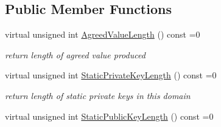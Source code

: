 \subsection*{Public Member Functions}
\begin{DoxyCompactItemize}
\item 
\hypertarget{class_authenticated_key_agreement_domain_a98ff4ab957b445060f06c95636a098ea}{
virtual unsigned int \hyperlink{class_authenticated_key_agreement_domain_a98ff4ab957b445060f06c95636a098ea}{AgreedValueLength} () const =0}
\label{class_authenticated_key_agreement_domain_a98ff4ab957b445060f06c95636a098ea}

\begin{DoxyCompactList}\small\item\em return length of agreed value produced \item\end{DoxyCompactList}\item 
\hypertarget{class_authenticated_key_agreement_domain_a1ede4e454e74031ec0f0786dc2a14ddf}{
virtual unsigned int \hyperlink{class_authenticated_key_agreement_domain_a1ede4e454e74031ec0f0786dc2a14ddf}{StaticPrivateKeyLength} () const =0}
\label{class_authenticated_key_agreement_domain_a1ede4e454e74031ec0f0786dc2a14ddf}

\begin{DoxyCompactList}\small\item\em return length of static private keys in this domain \item\end{DoxyCompactList}\item 
\hypertarget{class_authenticated_key_agreement_domain_aa7a7a1a641b21fb55cfec96cbf029795}{
virtual unsigned int \hyperlink{class_authenticated_key_agreement_domain_aa7a7a1a641b21fb55cfec96cbf029795}{StaticPublicKeyLength} () const =0}
\label{class_authenticated_key_agreement_domain_aa7a7a1a641b21fb55cfec96cbf029795}


\end{DoxyCompactItemize}
